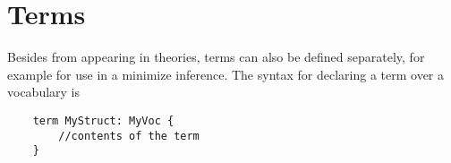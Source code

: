 \section{Terms}
Besides from appearing in theories, terms can also be defined separately, for example for use in a minimize inference. The syntax for declaring a term  over a vocabulary  is
\begin{lstlisting}
	term MyStruct: MyVoc {
		//contents of the term
	}
\end{lstlisting}
